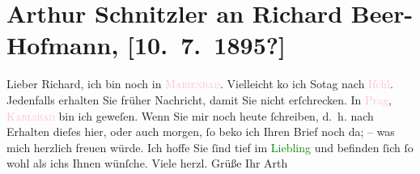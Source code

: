 

               \section[Arthur Schnitzler an Richard Beer-Hofmann, {[}10. 7. 1895?{]}]{ Arthur Schnitzler an Richard Beer-Hofmann, {[}10. 7. 1895?{]}}\nopagebreak{}\rehead{ }\normalsize\beginnumbering{} \toendnotes[C]{\smallbreak\pagebreak[2]} 
\pstart
           \noindent{}{\pb}Lieber Richard, ich bin noch in \textcolor{pink}{\textsc{Marienbad}}{}\ledrightnote{\textcolor{pink}{Marienbad}}. Vielleicht ko{\geminationm} ich So{\geminationn}tag nach \textcolor{pink}{Iſchl}{}\ledrightnote{\textcolor{pink}{Bad Ischl}}. Jedenfalls erhalten Sie früher Nachricht, damit Sie nicht
               erſchrecken. In \textcolor{pink}{Prag}{}\ledrightnote{\textcolor{pink}{Prag}}, \textcolor{pink}{\textsc{Karlsbad}}{}\ledrightnote{\textcolor{pink}{Karlsbad}} bin ich geweſen. Wenn Sie mir {\pb}noch heute
               ſchreiben, d. h. nach Erhalten dieſes hier, oder auch morgen, ſo beko{\geminationm} ich Ihren Brief noch da; – was mich herzlich freuen
               würde. Ich hoffe Sie ſind tief im \textcolor{green}{Liebling}{}\ledrightnote{\textcolor{green}{Der Tod Georgs}} und
               befinden ſich ſo wohl als ichs Ihnen wünſche.\pend
           \pstart Viele herzl. Grüße Ihr \spacefill\mbox{Arth}\pend{}\endnumbering{}  
      